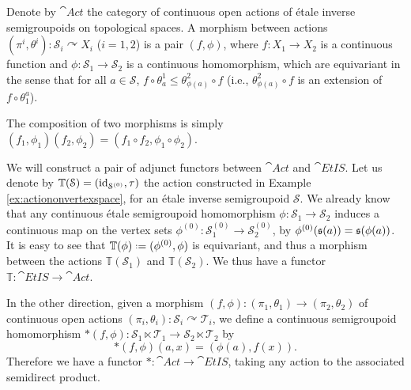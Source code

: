 Denote by $\cat{Act}$ the category of continuous open actions of étale inverse semigroupoids on topological spaces. A morphism between actions $(\pi^i,\theta^i)\colon\mathcal{S}_i\curvearrowright X_i$ ($i=1,2$) is a pair $(f,\phi)$, where $f\colon X_1\to X_2$ is a continuous function and $\phi\colon\mathcal{S}_1\to\mathcal{S}_2$ is a continuous homomorphism, which are equivariant in the sense that for all $a\in\mathcal{S}$, $f\circ\theta^1_a\leq \theta^2_{\phi(a)}\circ f$ (i.e., $\theta^2_{\phi(a)}\circ f$ is an extension of $f\circ\theta_1^a$).

The composition of two morphisms is simply $(f_1,\phi_1)(f_2,\phi_2)=(f_1\circ f_2,\phi_1\circ\phi_2)$.

We will construct a pair of adjunct functors between $\cat{Act}$ and $\cat{EtIS}$. Let us denote by $\mathbb{T}(\mathcal{S})=(\operatorname{id}_{\mathcal{S}^{(0)}},\tau)$ the action constructed in Example \ref{ex:actiononvertexspace}, for an étale inverse semigroupoid $\mathcal{S}$. We already know that any continuous étale semigroupoid homomorphism $\phi\colon\mathcal{S}_1\to\mathcal{S}_2$ induces a continuous map on the vertex sets $\phi^{(0)}\colon\mathcal{S}_1^{(0)}\to\mathcal{S}_2^{(0)}$, by $\phi^{(0)}(\operatorname{\mathfrak{s}}(a))=\operatorname{\mathfrak{s}}(\phi(a))$. It is easy to see that $\mathbb{T}(\phi)\defeq(\phi^{(0)},\phi)$ is equivariant, and thus a morphism between the actions $\mathbb{T}(\mathcal{S}_1)$ and $\mathbb{T}(\mathcal{S}_2)$. We thus have a functor $\mathbb{T}\colon\cat{EtIS}\to\cat{Act}$.

In the other direction, given a morphism $(f,\phi)\colon(\pi_1,\theta_1)\to(\pi_2,\theta_2)$ of continuous open actions $(\pi_i,\theta_i)\colon\mathcal{S}_i\curvearrowright \mathcal{T}_i$, we define a continuous semigroupoid homomorphism $\ast(f,\phi)\colon\mathcal{S}_1\ltimes\mathcal{T}_1\to\mathcal{S}_2\ltimes \mathcal{T}_2$ by
\[\ast(f,\phi)(a,x)=(\phi(a),f(x)).\]
Therefore we have a functor $\ast\colon\cat{Act}\to\cat{EtIS}$, taking any action to the associated semidirect product.

